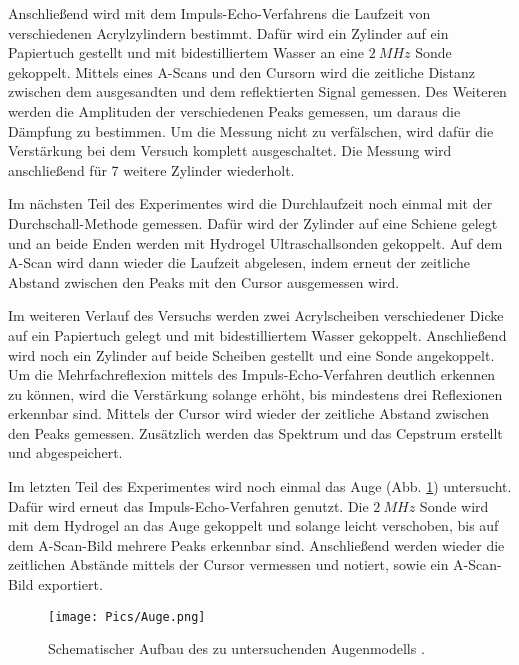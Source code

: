 Anschließend wird mit dem Impuls-Echo-Verfahrens die Laufzeit von verschiedenen
Acrylzylindern bestimmt. Dafür wird ein Zylinder auf ein Papiertuch gestellt und
mit bidestilliertem Wasser an eine $\SI{2}{MHz}$ Sonde gekoppelt. Mittels eines
A-Scans und den Cursorn wird die zeitliche Distanz zwischen dem ausgesandten und
dem reflektierten Signal gemessen.
Des Weiteren werden die Amplituden der verschiedenen Peaks gemessen, um
daraus die Dämpfung zu bestimmen. Um die Messung nicht zu verfälschen, wird dafür
die Verstärkung bei dem Versuch komplett ausgeschaltet. Die Messung wird anschließend
für 7 weitere Zylinder wiederholt.

Im nächsten Teil des Experimentes wird die Durchlaufzeit noch einmal mit der
Durchschall-Methode gemessen. Dafür wird der Zylinder auf eine Schiene gelegt und
an beide Enden werden mit Hydrogel Ultraschallsonden gekoppelt. Auf dem
A-Scan wird dann wieder die Laufzeit abgelesen, indem erneut der zeitliche
Abstand zwischen den Peaks mit den Cursor ausgemessen wird.

Im weiteren Verlauf des Versuchs werden zwei Acrylscheiben verschiedener Dicke
auf ein Papiertuch gelegt und mit bidestilliertem Wasser gekoppelt. Anschließend
wird noch ein Zylinder auf beide Scheiben gestellt und eine Sonde angekoppelt.
Um die Mehrfachreflexion mittels des Impuls-Echo-Verfahren deutlich erkennen zu
können, wird die Verstärkung
solange erhöht, bis mindestens drei Reflexionen erkennbar sind. Mittels der Cursor
wird wieder der zeitliche Abstand zwischen den Peaks gemessen. Zusätzlich werden
das Spektrum und das Cepstrum erstellt und abgespeichert.

Im letzten Teil des Experimentes wird noch einmal das Auge (Abb. \ref{fig:Auge}) untersucht. Dafür wird
erneut das Impuls-Echo-Verfahren genutzt. Die $\SI{2}{MHz}$ Sonde wird mit dem
Hydrogel an das Auge gekoppelt und solange leicht verschoben, bis auf dem A-Scan-Bild
mehrere Peaks erkennbar sind. Anschließend werden wieder die zeitlichen Abstände
mittels der Cursor vermessen und notiert, sowie ein A-Scan-Bild exportiert.

\begin{figure}
  \centering
  \texttt{[image: Pics/Auge.png]}
  \caption{Schematischer Aufbau des zu untersuchenden Augenmodells \cite{anleitung01}.}
  \label{fig:Auge}
\end{figure}
